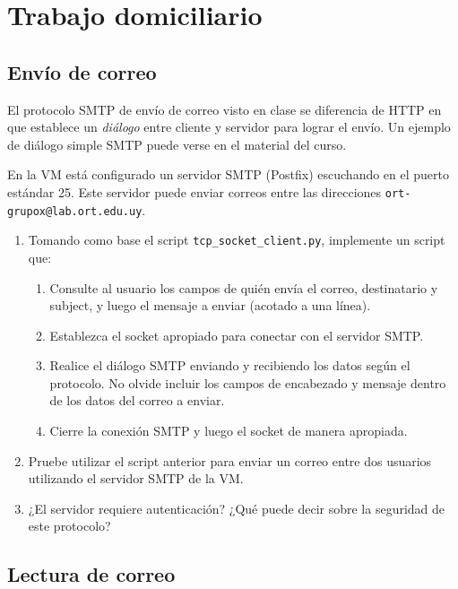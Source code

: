 \documentclass[a4paper,10pt]{article}
\begin{document}
\section*{Trabajo domiciliario}

\subsection*{Envío de correo}

El protocolo SMTP de envío de correo visto en clase se diferencia de HTTP en que establece un \emph{diálogo} entre cliente y servidor para lograr el envío. Un ejemplo de diálogo simple SMTP puede verse en el material del curso.

En la VM está configurado un servidor SMTP (Postfix) escuchando en el puerto estándar 25. Este servidor puede enviar correos entre las direcciones \texttt{ort-grupox@lab.ort.edu.uy}.

\begin{enumerate}
    \item Tomando como base el script \texttt{tcp\_socket\_client.py}, implemente un script que:
      \begin{enumerate}
        \item Consulte al usuario los campos de quién envía el correo, destinatario y subject, y luego el mensaje a enviar (acotado a una línea).
        \item Establezca el socket apropiado para conectar con el servidor SMTP.
        \item Realice el diálogo SMTP enviando y recibiendo los datos según el protocolo. No olvide incluir los campos de encabezado y mensaje dentro de los datos del correo a enviar.
        \item Cierre la conexión SMTP y luego el socket de manera apropiada.
      \end{enumerate}

    \item Pruebe utilizar el script anterior para enviar un correo entre dos usuarios utilizando el servidor SMTP de la VM.
    \item ¿El servidor requiere autenticación? ¿Qué puede decir sobre la seguridad de este protocolo? 
\end{enumerate}

\subsection*{Lectura de correo}
\end{document}
